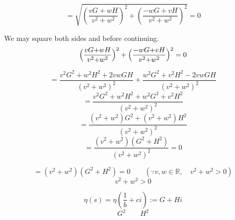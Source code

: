 \documentclass{amsart}
\begin{document}
	\[ = \sqrt{(\frac{vG{+}wH}{v^2{+}w^2})^2 + (\frac{-wG{+}vH}{v^2{+}w^2})^2} = 0 \]
	
	We may square both sides and before continuing.
	\[ \Bigl(\frac{vG{+}wH}{v^2{+}w^2}\Bigr)^2 + \Bigl(\frac{-wG{+}vH}{v^2{+}w^2}\Bigr)^2 = 0 \]
	
	\[ = \frac{v^2G^2 + w^2H^2 + 2vwGH}{(v^2+w^2)^2} + \frac{w^2G^2 + v^2H^2 - 2vwGH}{(v^2+w^2)^2} \]
	\[ = \frac{v^2G^2 + w^2H^2 + w^2G^2 + v^2H^2}{(v^2+w^2)^2} \]
	\[ = \frac{(v^2+w^2)G^2 + (v^2+w^2)H^2}{(v^2+w^2)^2} \]
	\[ = \frac{(v^2+w^2)(G^2 + H^2)}{(v^2+w^2)^2} = 0 \]
	
	\[ = (v^2+w^2)(G^2 + H^2) = 0 \qquad (\because v, w \in \mathbb{R}, \quad v^2 + w^2 > 0)  \]
	\[ v^2+w^2 > 0 \]
	
	\[ \eta(s) = \eta(\frac{1}{b}+ci) := G+Hi \]
	\[ G^2 \qquad H^2\]
	
\end{document}
